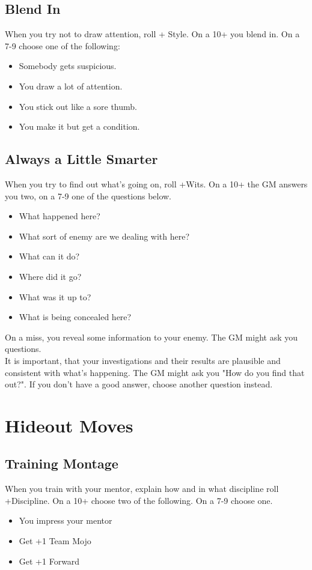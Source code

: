 \documentclass{book}
\begin{document}
\section*{Blend In}
When you try not to draw attention, roll + Style. On a 10+ you blend in. On a 7-9 choose one of the following:
\begin{itemize}
    \item Somebody gets suspicious.
    \item You draw a lot of attention.
    \item You stick out like a sore thumb.
    \item You make it but get a condition.
\end{itemize}

\section*{Always a Little Smarter}
When you try to find out what's going on, roll +Wits. On a 10+ the GM answers you two, on a 7-9 one of the questions below.
\begin{itemize}
    \item What happened here?
    \item What sort of enemy are we dealing with here?
    \item What can it do?
    \item Where did it go?
    \item What was it up to?
    \item What is being concealed here?
\end{itemize}
On a miss, you reveal some information to your enemy. The GM might ask you questions.\\
It is important, that your investigations and their results are plausible and consistent with what's happening. The GM might ask you "How do you find that out?". If you don't have a good answer, choose another question instead.

\chapter*{Hideout Moves}
\section*{Training Montage}
When you train with your mentor, explain how and in what discipline roll +Discipline. On a 10+ choose two of the following. On a 7-9 choose one.
\begin{itemize}
    \item You impress your mentor
    \item Get +1 Team Mojo
    \item Get +1 Forward
\end{itemize}
\end{document}
